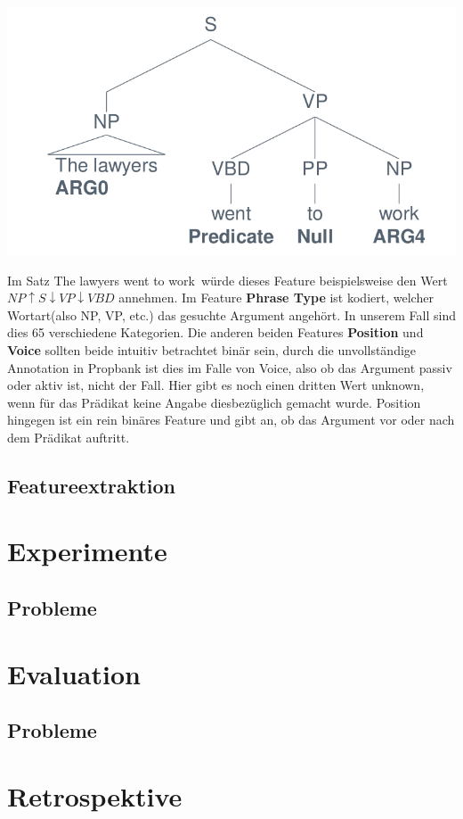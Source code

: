 \documentclass[]{article}
\begin{document}
\centering	\includegraphics[scale=0.4]{Syntaxbaum}


Im Satz \glqq The lawyers went to work\grqq\ würde dieses Feature beispielsweise den Wert 
$ NP\uparrow S\downarrow VP\downarrow VBD$ annehmen. Im Feature \textbf{Phrase Type} ist kodiert, welcher Wortart(also NP, VP, etc.) das gesuchte Argument angehört. In unserem Fall sind dies 65 verschiedene Kategorien. 
Die anderen beiden Features \textbf{Position} und \textbf{Voice} sollten beide intuitiv betrachtet binär sein, durch die unvollständige Annotation in Propbank ist dies im Falle von Voice, also ob das Argument passiv oder aktiv ist, nicht der Fall. Hier gibt es noch einen dritten Wert unknown, wenn für das Prädikat keine Angabe diesbezüglich gemacht wurde. Position hingegen ist ein rein binäres Feature und gibt an, ob das Argument vor oder nach dem Prädikat auftritt. 

\subsection{Featureextraktion}

\section{Experimente}
\subsection{Probleme}

\section{Evaluation}
\subsection{Probleme}

\section{Retrospektive}


\end{document}
